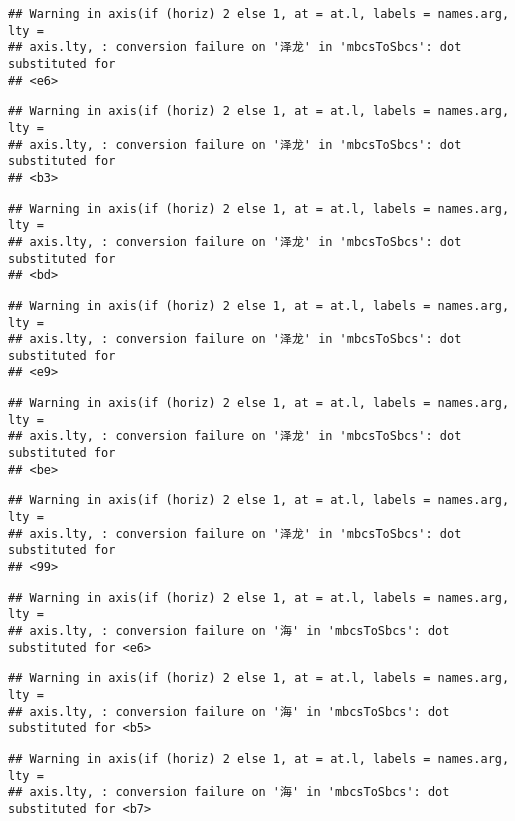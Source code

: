 \documentclass[
]{article}
\begin{document}
\begin{verbatim}
## Warning in axis(if (horiz) 2 else 1, at = at.l, labels = names.arg, lty =
## axis.lty, : conversion failure on '泽龙' in 'mbcsToSbcs': dot substituted for
## <e6>
\end{verbatim}

\begin{verbatim}
## Warning in axis(if (horiz) 2 else 1, at = at.l, labels = names.arg, lty =
## axis.lty, : conversion failure on '泽龙' in 'mbcsToSbcs': dot substituted for
## <b3>
\end{verbatim}

\begin{verbatim}
## Warning in axis(if (horiz) 2 else 1, at = at.l, labels = names.arg, lty =
## axis.lty, : conversion failure on '泽龙' in 'mbcsToSbcs': dot substituted for
## <bd>
\end{verbatim}

\begin{verbatim}
## Warning in axis(if (horiz) 2 else 1, at = at.l, labels = names.arg, lty =
## axis.lty, : conversion failure on '泽龙' in 'mbcsToSbcs': dot substituted for
## <e9>
\end{verbatim}

\begin{verbatim}
## Warning in axis(if (horiz) 2 else 1, at = at.l, labels = names.arg, lty =
## axis.lty, : conversion failure on '泽龙' in 'mbcsToSbcs': dot substituted for
## <be>
\end{verbatim}

\begin{verbatim}
## Warning in axis(if (horiz) 2 else 1, at = at.l, labels = names.arg, lty =
## axis.lty, : conversion failure on '泽龙' in 'mbcsToSbcs': dot substituted for
## <99>
\end{verbatim}

\begin{verbatim}
## Warning in axis(if (horiz) 2 else 1, at = at.l, labels = names.arg, lty =
## axis.lty, : conversion failure on '海' in 'mbcsToSbcs': dot substituted for <e6>
\end{verbatim}

\begin{verbatim}
## Warning in axis(if (horiz) 2 else 1, at = at.l, labels = names.arg, lty =
## axis.lty, : conversion failure on '海' in 'mbcsToSbcs': dot substituted for <b5>
\end{verbatim}

\begin{verbatim}
## Warning in axis(if (horiz) 2 else 1, at = at.l, labels = names.arg, lty =
## axis.lty, : conversion failure on '海' in 'mbcsToSbcs': dot substituted for <b7>
\end{verbatim}
\end{document}

